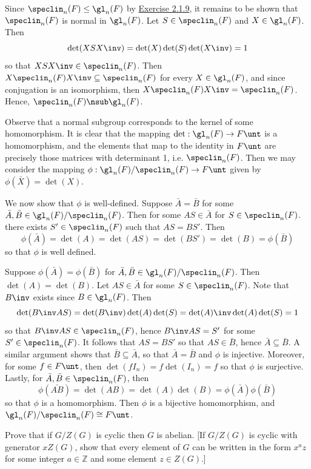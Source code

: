 \begin{sol}
    Since $\speclin_n(F) \leq \gl_n(F)$ by \hyperref[ex2.1.9]{Exercise 2.1.9}, it remains to be shown that $\speclin_n(F)$ is normal in $\gl_n(F)$. Let $S \in \speclin_n(F)$ and $X \in \gl_n(F)$. Then
    \[\det(XSX\inv) = \det(X)\det(S)\det(X\inv) = 1\]
    so that $XSX\inv \in \speclin_n(F)$. Then $X\speclin_n(F)X\inv \subseteq \speclin_n(F)$ for every $X \in \gl_n(F)$, and since conjugation is an isomorphism, then $X\speclin_n(F)X\inv = \speclin_n(F)$. Hence, $\speclin_n(F) \nsub \gl_n(F)$.

    Observe that a normal subgroup corresponds to the kernel of some homomorphism. It is clear that the mapping $\det : \gl_n(F) \to F\unt$ is a homomorphism, and the elements that map to the identity in $F\unt$ are precisely those matrices with determinant 1, i.e. $\speclin_n(F)$. Then we may consider the mapping $\phi : \gl_n(F)/\speclin_n(F) \to F\unt$ given by $\phi(\bar X) = \det(X)$.

    We now show that $\phi$ is well-defined. Suppose $\bar A = \bar B$ for some $\bar A, \bar B \in \gl_n(F)/\speclin_n(F)$. Then for some $AS \in \bar A$ for $S \in \speclin_n(F)$. there exists $S' \in \speclin_n(F)$ such that $AS = BS'$. Then
    \[\phi(\bar A) = \det(A) = \det(AS) = \det(BS') = \det(B) = \phi(\bar B)\]
    so that $\phi$ is well defined.

    Suppose $\phi(\bar A) = \phi(\bar B)$ for $\bar A, \bar B \in \gl_n(F)/\speclin_n(F)$. Then $\det(A) = \det(B)$. Let $AS \in \bar A$ for some $S \in \speclin_n(F)$. Note that $B\inv$ exists since $B \in \gl_n(F)$. Then
    \[\det(B\inv AS) = \det(B\inv)\det(A)\det(S) = \det(A)\inv\det(A)\det(S) = 1\]
    so that $B\inv AS \in \speclin_n(F)$, hence $B\inv AS = S'$ for some $S' \in \speclin_n(F)$. It follows that $AS = BS'$ so that $AS \in \bar B$, hence $\bar A \subseteq \bar B$. A similar argument shows that $\bar B \subseteq \bar A$, so that $\bar A = \bar B$ and $\phi$ is injective. Moreover, for some $f \in F\unt$, then $\det(fI_n) = f\det(I_n) = f$ so that $\phi$ is surjective. Lastly, for $\bar A, \bar B \in \speclin_n(F)$, then
    \[\phi(\bar{AB}) = \det(AB) = \det(A)\det(B) = \phi(\bar A)\phi(\bar B)\]
    so that $\phi$ is a homomorphism. Then $\phi$ is a bijective homomorphism, and $\gl_n(F)/\speclin_n(F) \cong F\unt$.
\end{sol}

\newpage

\begin{exercise}\label{ex3.1.36} 
    Prove that if $G/Z(G)$ is cyclic then $G$ is abelian. [If $G/Z(G)$ is cyclic with generator $xZ(G)$, show that every element of $G$ can be written in the form $x^a z$ for some integer $a \in \mathbb{Z}$ and some element $z \in Z(G)$.]
\end{exercise}

